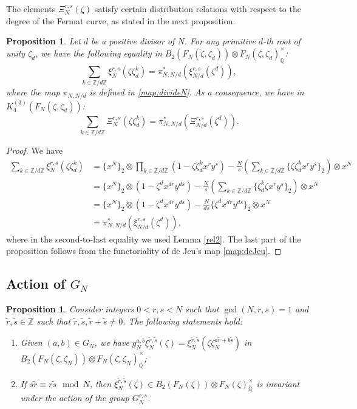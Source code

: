 \documentclass[11pt,a4,leqno]{amsart}
\theoremstyle{my theoremstyle}
\newtheorem{prop}[thm]{Proposition}
\theoremstyle{dfn}
\theoremstyle{remark}
\renewcommand{\1}{\mathbbm{1}}
\newcommand{\Z}{\mathbb{Z}}
\newcommand{\Q}{\mathbb{Q}}
\newcommand{\z}{\zeta}
\numberwithin{equation}{section}
\begin{document}
The elements $\Xi^{r,s}_N(\z)$ satisfy certain distribution relations with respect to the degree of the Fermat curve, as stated in the next proposition.

\begin{prop}\label{dist:cocycle}
Let $d$ be a positive divisor of $N$. For any primitive $d$-th root of unity $\z_d$, we have the following equality in $B_2(F_N(\z,\z_d))\otimes F_N(\z,\z_d)^\times_{\Q}$:
    \begin{equation*}
    \sum_{k \in \Z/d\Z} \xi_N^{r,s}(\zeta \zeta_d^k) = \pi_{N,N/d}^*(\xi_{N/d}^{r,s}(\zeta^d)),
    \end{equation*}
where the map $\pi_{N, N/d}$ is defined in \eqref{map:divideN}. As a consequence, we have in $K_4^{(3)}(F_N(\zeta,\zeta_d))$:
\begin{equation*}
    \sum_{k \in \Z/d\Z} \Xi_N^{r,s}(\zeta \zeta_d^k) = \pi_{N,N/d}^*(\Xi_{N/d}^{r,s}(\zeta^d)).
\end{equation*}
\end{prop}

\begin{proof}
We have
    \begin{align*}
        \sum_{k \in \Z/d\Z} \xi_N^{r,s}(\zeta \zeta_d^k) &= \{x^N\}_2 \otimes \prod_{k\in \Z/d\Z}(1- \z \z_d^k x^r y^s) - \frac{N}{s} \left( \sum_{k \in \Z/d\Z} \{\z\z_d^k x^r y^s\}_2 \right) \otimes x^N \\
        & = \{x^N\}_2 \otimes (1- \z^d x^{dr} y^{ds}) - \frac{N}{s} \left( \sum_{k \in \Z/d\Z} \{\z_d^k\z x^r y^s\}_2 \right) \otimes x^N \\
        & =\{x^N\}_2 \otimes (1- \z^d x^{dr} y^{ds}) - \frac{N}{ds} \{\z^d x^{dr} y^{ds}\}_2 \otimes x^N \\
        &= \pi_{N,N/d}^*(\xi_{N/d}^{r,s}(\zeta^d)),
    \end{align*}
    where in the second-to-last equality we used Lemma \ref{rel2}. The last part of the proposition follows from the functoriality of de Jeu's map \eqref{map:deJeu}.
\end{proof}

\subsection{Action of $G_N$}


\begin{prop}\label{prop:trace}
Consider integers $0<r,s<N$ such that $\gcd(N, r,s)=1$ and $\tilde r, \tilde s \in \Z$ such that $\tilde r, \tilde s, \tilde r+ \tilde s \neq 0$. The following statements hold:
\begin{enumerate}
\item Given $(a,b)\in G_N$, we have $g_N^{a,b}\xi_N^{\tilde r, \tilde s}(\z)=\xi^{\tilde r, \tilde s}_N(\z \z_N^{a \tilde r + b \tilde s})$ in $B_2(F_N(\z,\z_N))\otimes F_N(\z,\z_N)^\times_{\Q}$;
\item If $s \tilde r \equiv r \tilde s \mod N$, then $\xi^{\tilde r, \tilde s}_N(\z)\in B_2(F_N(\z))\otimes F_N(\z)^\times_{\Q}$ is invariant under the action of the group $G_N^{r,s}$.
\end{enumerate}
\end{prop}
\end{document}
